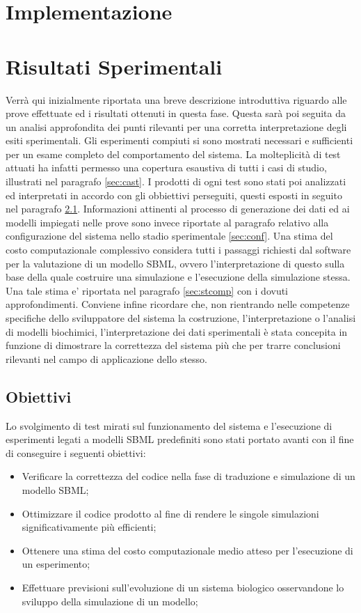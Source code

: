 \documentclass[Lau, oneside]{sapthesis}
\begin{document}
\chapter{Implementazione}
\label{chap:4}

\chapter{Risultati Sperimentali}
Verrà qui inizialmente riportata una breve descrizione introduttiva riguardo alle prove effettuate ed i risultati ottenuti in questa fase. Questa sarà poi seguita da un analisi approfondita dei punti rilevanti per una corretta interpretazione degli esiti sperimentali.
Gli esperimenti compiuti si sono mostrati necessari e sufficienti per un esame completo del comportamento del sistema. La molteplicità di test attuati ha infatti permesso una copertura esaustiva di tutti i casi di studio, illustrati nel paragrafo \ref{sec:cast}. I prodotti di ogni test sono stati poi analizzati ed interpretati in accordo con gli obbiettivi perseguiti, questi esposti in seguito nel paragrafo \ref{sec:obi}.
Informazioni attinenti al processo di generazione dei dati ed ai modelli impiegati nelle prove sono invece riportate al paragrafo relativo alla configurazione del sistema nello stadio sperimentale \ref{sec:conf}.
Una stima del costo computazionale complessivo considera tutti i passaggi richiesti dal software per la valutazione di un modello SBML, ovvero l'interpretazione di questo sulla base della quale costruire una simulazione e l'esecuzione della simulazione stessa. Una tale stima e' riportata nel paragrafo \ref{sec:stcomp} con i dovuti approfondimenti.
Conviene infine ricordare che, non rientrando nelle competenze specifiche dello sviluppatore del sistema la costruzione, l'interpretazione o l’analisi di modelli biochimici, l'interpretazione dei dati sperimentali \`e stata concepita in funzione di dimostrare la correttezza del sistema più che per trarre conclusioni rilevanti nel campo di applicazione dello stesso.

\newpage
\section{Obiettivi}
\label{sec:obi}
Lo svolgimento di test mirati sul funzionamento del sistema e l'esecuzione di esperimenti legati a modelli SBML predefiniti sono stati portato avanti con il fine di conseguire i seguenti obiettivi:
\begin{itemize}
    \item Verificare la correttezza del codice nella fase di traduzione e simulazione di un modello SBML;
    \item Ottimizzare il codice prodotto al fine di rendere le singole simulazioni significativamente più efficienti;
    \item Ottenere una stima del costo computazionale medio atteso per l'esecuzione di un esperimento;
    \item Effettuare previsioni sull'evoluzione di un sistema biologico osservandone lo sviluppo della simulazione di un modello;
\end{itemize}
\end{document}
